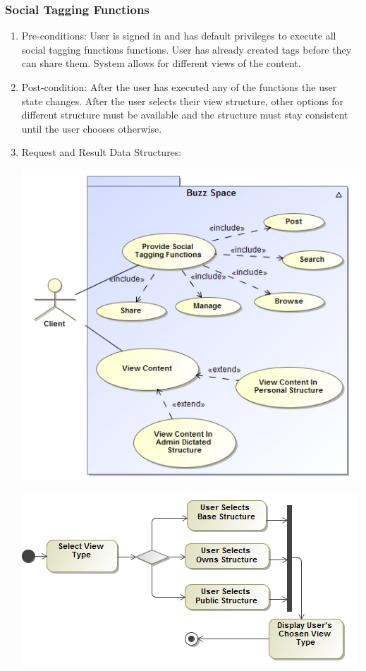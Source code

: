 \documentclass[hidelinks, 12pt, oneside]{article}
\begin{document}
\subsubsection{Social Tagging Functions}
\begin{enumerate}
\item Pre-conditions: User is signed in and has default privileges to execute all social tagging functions functions. User has already created tags before they can share them. System allows for different views of the content.
\item Post-condition: After the user has executed any of the functions the user state changes. After the user selects their view structure, other options for different structure must be available and the structure must stay consistent until the user chooses otherwise.
\item Request and Result Data Structures:
\begin{center}
\centerline{\includegraphics[scale=0.5]{socialTagging.jpg}}
\centerline{\includegraphics[scale=0.5]{socialTaggingActivity.jpg}}
\end{center}
\end{enumerate}
\end{document}
